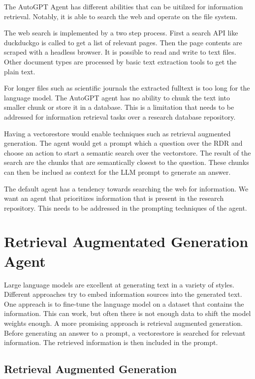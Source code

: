 \documentclass[english, version-2022-01]{uzl-thesis}
\begin{document}
The AutoGPT Agent has different abilities that can be uitilzed for information retrieval. Notably, it is able to search the web and operate on the file system.

The web search is implemented by a two step process. First a search API like duckduckgo is called to get a list of relevant pages. Then the page contents are scraped with a headless browser. It is possible to read and write to text files. Other document types are processed by basic text extraction tools to get the plain text.

For longer files such as scientific journals the extracted fulltext is too long for the language model. The AutoGPT agent has no ability to chunk the text into smaller chunk or store it in a database. This is a limitation that needs to be addressed for information retrieval tasks over a research database repository.

Having a vectorestore would enable techniques such as retrieval augmented generation. The agent would get a prompt which a question over the RDR and choose an action to start a semantic search over the vectorstore. The result of the search are the chunks that are semantically closest to the question. These chunks can then be inclued as context for the LLM prompt to generate an answer.

The default agent has a tendency towards searching the web for information. We want an agent that prioritizes information that is present in the research repository. This needs to be addressed in the prompting techniques of the agent.

\chapter{Retrieval Augmentated Generation Agent}

Large language models are excellent at generating text in a variety of styles. Different approaches try to embed information sources into the generated text. One appreach is to fine-tune the language model on a dataset that contains the information. This can work, but often there is not enough data to shift the model weights enough. A more promising approach is retrieval augmented generation. Before generating an answer to a prompt, a vectorestore is searched for relevant information. The retrieved information is then included in the prompt.
\section{Retrieval Augmented Generation}
\end{document}
